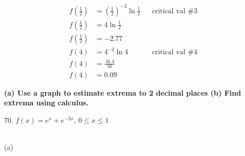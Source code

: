 \documentclass{article}
\begin{document}
\begin{description}
\begin{description}
\begin{align*}
                        f\left(\frac{1}{2}\right) & = \left(\frac{1}{2}\right)^{-2}\ln{\frac{1}{2}} &  & \text{critical val \#3} \\
                        f\left(\frac{1}{2}\right) & = 4\ln{\frac{1}{2}}                                                          \\
                        f\left(\frac{1}{2}\right) & = -2.77                                                                      \\[2em]
                        f(4)                      & = 4^{-2}\ln{4}                                  &  & \text{critical val \#4} \\
                        f(4)                      & = \frac{\ln{4}}{16}                                                          \\
                        f(4)                      & = 0.09
                    \end{align*}
          \end{description}
    \item\textbf{(a) Use a graph to estimate extrema to 2 decimal places (b) Find extrema using calculus. }
          \begin{description}
              \setlength\itemsep{3em}
              \item 70. $f(x) = e^x + e^{-2x}$, \space $0 \leq x \leq 1$

                     \\

                    (a) 


\end{description}
\end{description}
\end{document}
